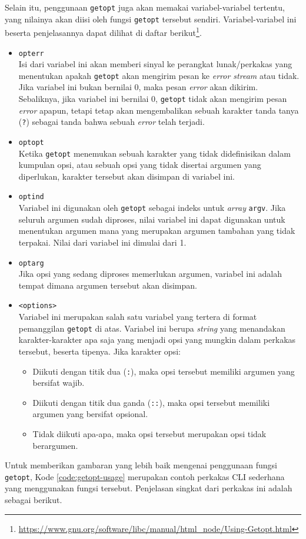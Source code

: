 Selain itu, penggunaan \verb|getopt| juga akan memakai variabel-variabel tertentu, yang nilainya akan diisi oleh fungsi \verb|getopt| tersebut sendiri. Variabel-variabel ini beserta penjelasannya dapat dilihat di daftar berikut\footnote{\href{https://www.gnu.org/software/libc/manual/html\_node/Using-Getopt.html}{https://www.gnu.org/software/libc/manual/html\_node/Using-Getopt.html}}.
\begin{itemize}
	\item \verb|opterr|\\
	Isi dari variabel ini akan memberi sinyal ke perangkat lunak/perkakas yang menentukan apakah \verb|getopt| akan mengirim pesan ke \textit{error stream} atau tidak. Jika variabel ini bukan bernilai 0, maka pesan \textit{error} akan dikirim. Sebaliknya, jika variabel ini bernilai 0, \verb|getopt| tidak akan mengirim pesan \textit{error} apapun, tetapi tetap akan mengembalikan sebuah karakter tanda tanya (\verb|?|) sebagai tanda bahwa sebuah \textit{error} telah terjadi.
	\item \verb|optopt|\\
	Ketika \verb|getopt| menemukan sebuah karakter yang tidak didefinisikan dalam kumpulan opsi, atau sebuah opsi yang tidak disertai argumen yang diperlukan, karakter tersebut akan disimpan di variabel ini.
	\item \verb|optind|\\
	Variabel ini digunakan oleh \verb|getopt| sebagai indeks untuk \textit{array} \verb|argv|. Jika seluruh argumen sudah diproses, nilai variabel ini dapat digunakan untuk menentukan argumen mana yang merupakan argumen tambahan yang tidak terpakai. Nilai dari variabel ini dimulai dari 1.
	\item \verb|optarg|\\
	Jika opsi yang sedang diproses memerlukan argumen, variabel ini adalah tempat dimana argumen tersebut akan disimpan.
	\item \verb|<options>|\\
	Variabel ini merupakan salah satu variabel yang tertera di format pemanggilan \verb|getopt| di atas. Variabel ini berupa \textit{string} yang menandakan karakter-karakter apa saja yang menjadi opsi yang mungkin dalam perkakas tersebut, beserta tipenya. Jika karakter opsi:
	
	\begin{itemize}
		\item Diikuti dengan titik dua (\verb|:|), maka opsi tersebut memiliki argumen yang bersifat wajib.
		\item Diikuti dengan titik dua ganda (\verb|::|), maka opsi tersebut memiliki argumen yang bersifat opsional.
		\item Tidak diikuti apa-apa, maka opsi tersebut merupakan opsi tidak berargumen.
	\end{itemize}
	
\end{itemize}
\noindent
Untuk memberikan gambaran yang lebih baik mengenai penggunaan fungsi \verb|getopt|, Kode \ref{code:getopt-usage} merupakan contoh perkakas CLI sederhana yang menggunakan fungsi tersebut. Penjelasan singkat dari perkakas ini adalah sebagai berikut.

